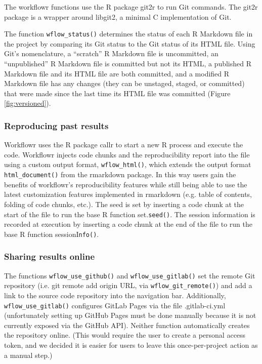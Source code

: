 \documentclass[9pt,a4paper]{extarticle}
\begin{document}
The workflowr functions use the R package git2r to run Git commands. The
git2r package is a wrapper around libgit2, a minimal C implementation of
Git.

The function \verb|wflow_status()| determines the status of each R Markdown
file in the project by comparing its Git status to the Git status of its
HTML file. Using Git’s nomenclature, a “scratch” R Markdown file is
uncommitted, an “unpublished” R Markdown file is committed but not its
HTML, a published R Markdown file and its HTML file are both committed,
and a modified R Markdown file has any changes (they can be unstaged,
staged, or committed) that were made since the last time its HTML file
was committed (Figure \ref{fig:versioned}).

\subsubsection*{Reproducing past results}

Workflowr uses the R package callr to start a new R process and execute
the code. Workflowr injects code chunks and the reproducibility report
into the file using a custom output format, \verb|wflow_html()|, which extends
the output format \verb|html_document()| from the rmarkdown package. In this
way users gain the benefits of workflowr’s reproducibility features
while still being able to use the latest customization features
implemented in rmarkdown (e.g. table of contents, folding of code
chunks, etc.). The seed is set by inserting a code chunk at the start of
the file to run the base R function set.\verb|seed()|. The session information
is recorded at execution by inserting a code chunk at the end of the
file to run the base R function sessionI\verb|nfo()|.

\subsubsection*{Sharing results online}

The functions \verb|wflow_use_github()| and \verb|wflow_use_gitlab()| set the remote
Git repository (i.e. git remote add origin URL, via \verb|wflow_git_remote()|)
and add a link to the source code repository into the navigation bar.
Additionally, \verb|wflow_use_gitlab()| configures GitLab Pages via the file
.gitlab-ci.yml (unfortunately setting up GitHub Pages must be done
manually because it is not currently exposed via the GitHub API).
Neither function automatically creates the repository online. (This
would require the user to create a personal access token, and we decided
it is easier for users to leave this once-per-project action as a manual
step.)
\end{document}

